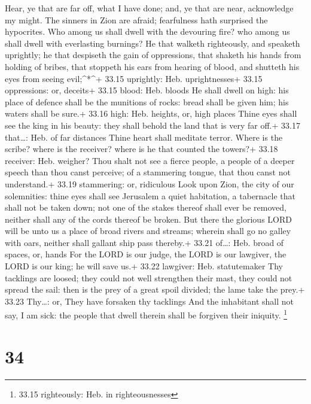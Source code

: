  Hear, ye that are far off, what I have done; and, ye that
are near, acknowledge my might.  The sinners in Zion are
afraid; fearfulness hath surprised the hypocrites. Who among us shall
dwell with the devouring fire? who among us shall dwell with everlasting
burnings?  He that walketh righteously, and speaketh
uprightly; he that despiseth the gain of oppressions, that shaketh his
hands from holding of bribes, that stoppeth his ears from hearing of
blood, and shutteth his eyes from seeing evil;\^{}*\^{}+ 33.15
uprightly: Heb. uprightnesses+ 33.15 oppressions: or, deceits+ 33.15
blood: Heb. bloods  He shall dwell on high: his place of
defence shall be the munitions of rocks: bread shall be given him; his
waters shall be sure.+ 33.16 high: Heb. heights, or, high places
 Thine eyes shall see the king in his beauty: they shall
behold the land that is very far off.+ 33.17 that\ldots: Heb. of far
distances  Thine heart shall meditate terror. Where is the
scribe? where is the receiver? where is he that counted the towers?+
33.18 receiver: Heb. weigher?  Thou shalt not see a fierce
people, a people of a deeper speech than thou canst perceive; of a
stammering tongue, that thou canst not understand.+ 33.19 stammering:
or, ridiculous  Look upon Zion, the city of our
solemnities: thine eyes shall see Jerusalem a quiet habitation, a
tabernacle that shall not be taken down; not one of the stakes thereof
shall ever be removed, neither shall any of the cords thereof be broken.
 But there the glorious LORD will be unto us a place of
broad rivers and streams; wherein shall go no galley with oars, neither
shall gallant ship pass thereby.+ 33.21 of\ldots: Heb. broad of spaces,
or, hands  For the LORD is our judge, the LORD is our
lawgiver, the LORD is our king; he will save us.+ 33.22 lawgiver: Heb.
statutemaker  Thy tacklings are loosed; they could not well
strengthen their mast, they could not spread the sail: then is the prey
of a great spoil divided; the lame take the prey.+ 33.23 Thy\ldots: or,
They have forsaken thy tacklings  And the inhabitant shall
not say, I am sick: the people that dwell therein shall be forgiven
their iniquity. \footnote{33.15 righteously: Heb. in righteousnesses}

\hypertarget{section-33}{%
\section{34}\label{section-33}}

